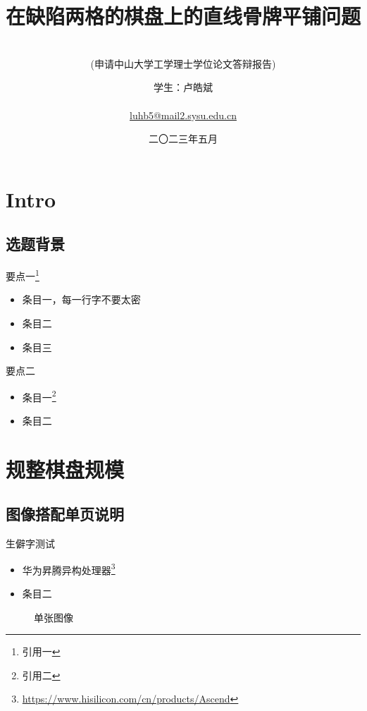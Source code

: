 \documentclass[
    fontset=fandol,
    xcolor=svgnames %
]{ctexbeamer}
\title{在缺陷两格的棋盘上的直线骨牌平铺问题}
\subtitle[申请中山大学理学学士学位论文答辩报告]{
    ~\\
    (申请中山大学工学理士学位论文答辩报告)
}
\author[卢皓斌]{
    \texorpdfstring{
        学生：卢皓斌\\
        ~\\
        \href{mailto:luhb5@mail2.sysu.edu.cn}{luhb5@mail2.sysu.edu.cn}
    }{PDF Bookmark Version}
}
\institute[中山大学~数学学院（珠海）]{
    \texttt{[image: ../image/template/logo.png]}

}
\date{
    二〇二三年五月
}
\begin{document}
\section{Intro}

\begin{frame}

    \titlepage

\end{frame}

\subsection{选题背景}

\begin{frame}

    \begin{block}{要点一\footnote{引用一}}
        \begin{itemize}
            \item 条目一，每一行字不要太密
            \item 条目二
            \item 条目三
        \end{itemize}
    \end{block}

    \begin{block}{要点二}
        \begin{itemize}
            \item 条目一\footnote{引用二}
            \item 条目二
        \end{itemize}
    \end{block}

\end{frame}

\section{规整棋盘规模}

\subsection{图像搭配单页说明}

\begin{frame}

    \begin{block}{生僻字测试}
        \begin{itemize}
            \item 华为昇腾异构处理器\footnote{\url{https://www.hisilicon.com/cn/products/Ascend}}
            \item 条目二
        \end{itemize}
    \end{block}

    \begin{figure}
        \caption{单张图像}
        \label{fig:hole}
    \end{figure}

\end{frame}
\end{document}
